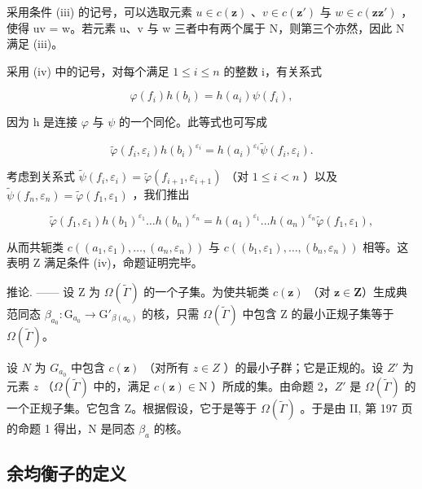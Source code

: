 采用条件 (iii) 的记号，可以选取元素 \(u \in c(\mathbf{z})\) 、\(v \in c(\mathbf{z}')\) 与 \(w \in c(\mathbf{z}\mathbf{z}')\) ，使得 uv = w。若元素 u、v 与 w 三者中有两个属于 N，则第三个亦然，因此 N 满足 (iii)。

采用 (iv) 中的记号，对每个满足 \(1 \leqslant i \leqslant n\) 的整数 i，有关系式

\[
  \varphi (f _ {i}) h (b _ {i}) = h (a _ {i}) \psi (f _ {i}),
\]

因为 h 是连接 \(\varphi\) 与 \(\psi\) 的一个同伦。此等式也可写成

\[
\widetilde {\varphi} (f _ {i}, \varepsilon_ {i}) h (b _ {i}) ^ {\varepsilon_ {i}} = h (a _ {i}) ^ {\varepsilon_ {i}} \widetilde {\psi} (f _ {i}, \varepsilon_ {i}).
\]

考虑到关系式 \(\widetilde{\psi}(f_i,\varepsilon_i) = \widetilde{\varphi}(f_{i + 1},\varepsilon_{i + 1})\) （对 \(1\leqslant i <   n\) ）以及 \(\widetilde{\psi} (f_n,\varepsilon_n) = \widetilde{\varphi} (f_1,\varepsilon_1)\) ，我们推出

\[
\widetilde {\varphi} (f _ {1}, \varepsilon_ {1}) h (b _ {1}) ^ {\varepsilon_ {1}} \dots h (b _ {n}) ^ {\varepsilon_ {n}} = h (a _ {1}) ^ {\varepsilon_ {1}} \dots h (a _ {n}) ^ {\varepsilon_ {n}} \widetilde {\varphi} (f _ {1}, \varepsilon_ {1}),
\]

从而共轭类 \(c((a_{1},\varepsilon_{1}),\ldots,(a_{n},\varepsilon_{n}))\) 与 \(c((b_{1},\varepsilon_{1}),\ldots,(b_{n},\varepsilon_{n}))\) 相等。这表明 Z 满足条件 (iv)，命题证明完毕。

推论. —— 设 Z 为 \(\Omega(\widetilde{\Gamma})\) 的一个子集。为使共轭类 \(c(\mathbf{z})\) （对 \(\mathbf{z} \in \mathbf{Z}\)）生成典范同态 \(\beta_{a_0}: \mathrm{G}_{a_0} \to \mathrm{G}'_{\beta(a_0)}\) 的核，只需 \(\Omega(\widetilde{\Gamma})\) 中包含 Z 的最小正规子集等于 \(\Omega(\widetilde{\Gamma})\)。

设 \(N\) 为 \(G_{a_{0}}\) 中包含 \(c(\mathbf{z})\) （对所有 \(z \in Z\) ）的最小子群；它是正规的。设 \(Z'\) 为元素 \(z\) （\(\Omega(\widetilde{\Gamma})\) 中的，满足 \(c(\mathbf{z}) \in \mathrm{N}\) ）所成的集。由命题 2，\(Z'\) 是 \(\Omega(\widetilde{\Gamma})\) 的一个正规子集。它包含 Z。根据假设，它于是等于 \(\Omega(\widetilde{\Gamma})\) 。于是由 II, 第 197 页的命题 1 得出，N 是同态 \(\beta_{a}\) 的核。

\subsection{余均衡子的定义}

